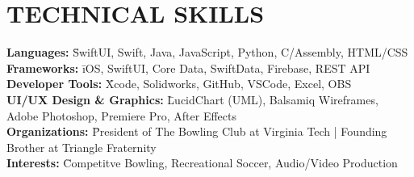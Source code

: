 \documentclass[10pt]{article}
\begin{document}
\section*{TECHNICAL SKILLS}

\begin{tabbing}
\hspace{0.25cm} \= \textbf{Languages:} \= SwiftUI, Swift, Java, JavaScript, Python, C/Assembly, HTML/CSS \\
\> \textbf{Frameworks:} \= iOS, SwiftUI, Core Data, SwiftData, Firebase, REST API \\
\> \textbf{Developer Tools:} \= Xcode, Solidworks, GitHub, VSCode, Excel, OBS \\
\> \textbf{UI/UX Design \& Graphics:} \= LucidChart (UML), Balsamiq Wireframes, Adobe Photoshop, Premiere Pro, After Effects \\
\> \textbf{Organizations:} \= President of The Bowling Club at Virginia Tech | Founding Brother at Triangle Fraternity\\
\> \textbf{Interests:} \= Competitve Bowling, Recreational Soccer, Audio/Video Production

\end{tabbing}
\end{document}
